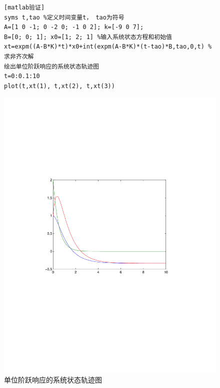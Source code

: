 \documentclass[a4paper]{article}
\begin{document}
\begin{figure}[htbp]
\begin{minipage}[c]{0.45\textwidth}
\begin{verbatim}[matlab验证]
syms t,tao %定义时间变量t， tao为符号
A=[1 0 -1; 0 -2 0; -1 0 2]; k=[-9 0 7];
B=[0; 0; 1]; x0=[1; 2; 1] %输入系统状态方程和初始值
xt=expm((A-B*K)*t)*x0+int(expm(A-B*K)*(t-tao)*B,tao,0,t) %求非齐次解
绘出单位阶跃响应的系统状态轨迹图
t=0:0.1:10
plot(t,xt(1), t,xt(2), t,xt(3))
\end{verbatim}
\end{minipage}
\begin{minipage}[c]{0.5\textwidth}
\caption{单位阶跃响应的系统状态轨迹图}
\includegraphics[width=\textwidth]{num6} 
\end{minipage}
\end{figure}
\end{document}
